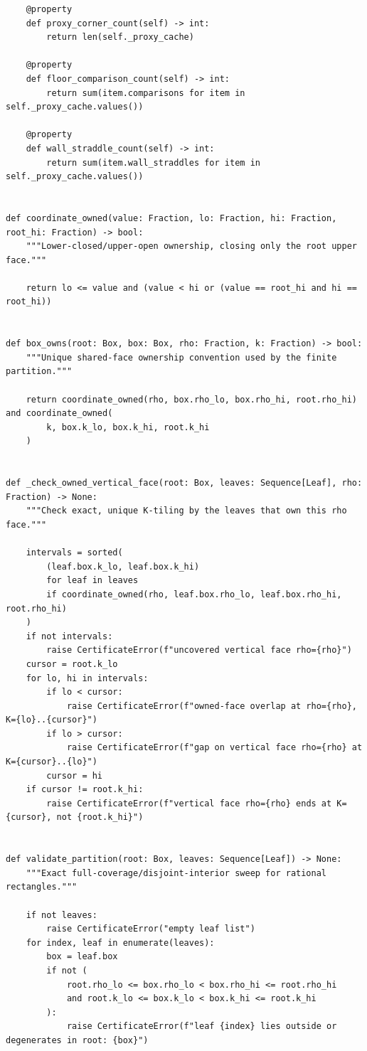 \documentclass[11pt]{article}
\numberwithin{equation}{section}
\theoremstyle{definition}
\theoremstyle{remark}
\begin{document}
\begin{lstlisting}
    @property
    def proxy_corner_count(self) -> int:
        return len(self._proxy_cache)

    @property
    def floor_comparison_count(self) -> int:
        return sum(item.comparisons for item in self._proxy_cache.values())

    @property
    def wall_straddle_count(self) -> int:
        return sum(item.wall_straddles for item in self._proxy_cache.values())


def coordinate_owned(value: Fraction, lo: Fraction, hi: Fraction, root_hi: Fraction) -> bool:
    """Lower-closed/upper-open ownership, closing only the root upper face."""

    return lo <= value and (value < hi or (value == root_hi and hi == root_hi))


def box_owns(root: Box, box: Box, rho: Fraction, k: Fraction) -> bool:
    """Unique shared-face ownership convention used by the finite partition."""

    return coordinate_owned(rho, box.rho_lo, box.rho_hi, root.rho_hi) and coordinate_owned(
        k, box.k_lo, box.k_hi, root.k_hi
    )


def _check_owned_vertical_face(root: Box, leaves: Sequence[Leaf], rho: Fraction) -> None:
    """Check exact, unique K-tiling by the leaves that own this rho face."""

    intervals = sorted(
        (leaf.box.k_lo, leaf.box.k_hi)
        for leaf in leaves
        if coordinate_owned(rho, leaf.box.rho_lo, leaf.box.rho_hi, root.rho_hi)
    )
    if not intervals:
        raise CertificateError(f"uncovered vertical face rho={rho}")
    cursor = root.k_lo
    for lo, hi in intervals:
        if lo < cursor:
            raise CertificateError(f"owned-face overlap at rho={rho}, K={lo}..{cursor}")
        if lo > cursor:
            raise CertificateError(f"gap on vertical face rho={rho} at K={cursor}..{lo}")
        cursor = hi
    if cursor != root.k_hi:
        raise CertificateError(f"vertical face rho={rho} ends at K={cursor}, not {root.k_hi}")


def validate_partition(root: Box, leaves: Sequence[Leaf]) -> None:
    """Exact full-coverage/disjoint-interior sweep for rational rectangles."""

    if not leaves:
        raise CertificateError("empty leaf list")
    for index, leaf in enumerate(leaves):
        box = leaf.box
        if not (
            root.rho_lo <= box.rho_lo < box.rho_hi <= root.rho_hi
            and root.k_lo <= box.k_lo < box.k_hi <= root.k_hi
        ):
            raise CertificateError(f"leaf {index} lies outside or degenerates in root: {box}")


\end{lstlisting}
\end{document}
